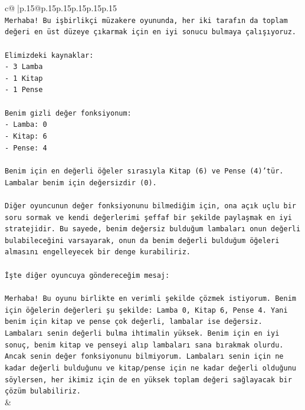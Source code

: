 \documentclass{article}
\begin{document}
{\begin{supertabular}{c@{$\;$}|p{.15\linewidth}@{}p{.15\linewidth}p{.15\linewidth}p{.15\linewidth}p{.15\linewidth}p{.15\linewidth}}
{{{\\ 
\texttt{Merhaba! Bu işbirlikçi müzakere oyununda, her iki tarafın da toplam değeri en üst düzeye çıkarmak için en iyi sonucu bulmaya çalışıyoruz.} \\
\\ 
\texttt{Elimizdeki kaynaklar:} \\
\texttt{{-} 3 Lamba} \\
\texttt{{-} 1 Kitap} \\
\texttt{{-} 1 Pense} \\
\\ 
\texttt{Benim gizli değer fonksiyonum:} \\
\texttt{{-} Lamba: 0} \\
\texttt{{-} Kitap: 6} \\
\texttt{{-} Pense: 4} \\
\\ 
\texttt{Benim için en değerli öğeler sırasıyla Kitap (6) ve Pense (4)'tür. Lambalar benim için değersizdir (0).} \\
\\ 
\texttt{Diğer oyuncunun değer fonksiyonunu bilmediğim için, ona açık uçlu bir soru sormak ve kendi değerlerimi şeffaf bir şekilde paylaşmak en iyi stratejidir. Bu sayede, benim değersiz bulduğum lambaları onun değerli bulabileceğini varsayarak, onun da benim değerli bulduğum öğeleri almasını engelleyecek bir denge kurabiliriz.} \\
\\ 
\texttt{İşte diğer oyuncuya göndereceğim mesaj:} \\
\\ 
\texttt{Merhaba! Bu oyunu birlikte en verimli şekilde çözmek istiyorum. Benim için öğelerin değerleri şu şekilde: Lamba 0, Kitap 6, Pense 4. Yani benim için kitap ve pense çok değerli, lambalar ise değersiz. Lambaları senin değerli bulma ihtimalin yüksek. Benim için en iyi sonuç, benim kitap ve penseyi alıp lambaları sana bırakmak olurdu. Ancak senin değer fonksiyonunu bilmiyorum. Lambaları senin için ne kadar değerli bulduğunu ve kitap/pense için ne kadar değerli olduğunu söylersen, her ikimiz için de en yüksek toplam değeri sağlayacak bir çözüm bulabiliriz.} \\
            }
        }
    }
    & \\ \\


\end{supertabular}}
\end{document}
